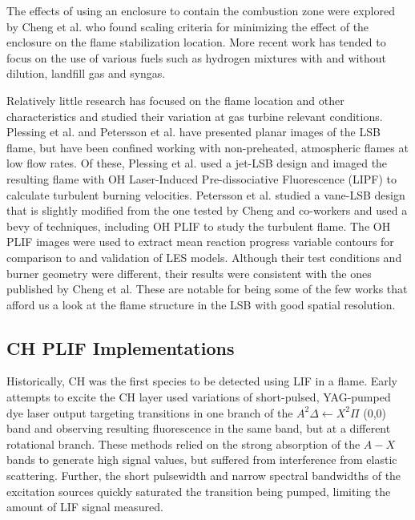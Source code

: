 The effects of using an enclosure to contain the combustion zone were explored by Cheng et al.\cite{2008-cheng-c} who found scaling criteria for minimizing the effect of the enclosure on the flame stabilization location. 
More recent work has tended to focus on the use of various fuels such as hydrogen mixtures\cite{2008-cheng-b} with and without dilution\cite{2007-littlejohn}, landfill gas\cite{2008-cheng-a,2009-cheng} and syngas\cite{2010-littlejohn}.

Relatively little research has focused on the flame location and other characteristics and studied their variation at gas turbine relevant conditions.
Plessing et al.\cite{2000-plessing} and Petersson et al.\cite{2007-petersson} have presented planar images of the LSB flame, but have been confined working with non-preheated, atmospheric flames at low flow rates.
Of these, Plessing et al. used a jet-LSB design and imaged the resulting flame with OH Laser-Induced Pre-dissociative Fluorescence (LIPF) to calculate turbulent burning velocities.
Petersson et al. studied a vane-LSB design that is slightly modified from the one tested by Cheng and co-workers and used a bevy of techniques, including OH PLIF to study the turbulent flame.
The OH PLIF images were used to extract mean reaction progress variable contours for comparison to and validation of LES models.
Although their test conditions and burner geometry were different, their results were consistent with the ones published by Cheng et al.
These are notable for being some of the few works that afford us a look at the flame structure in the LSB with good spatial resolution.

\subsection{CH PLIF Implementations}

Historically, CH was the first species to be detected using LIF in a flame.\cite{1973-barnes}
Early attempts\cite{1981-verdieck,1986-allen} to excite the CH layer used variations of short-pulsed, YAG-pumped dye laser output targeting transitions in one branch of the \(A^2\Delta\leftarrow X^2\Pi\) (0,0) band and observing resulting fluorescence in the same band, but at a different rotational branch.
These methods relied on the strong absorption of the \(A-X\) bands to generate high signal values, but suffered from interference from elastic scattering.
Further, the short pulsewidth and narrow spectral bandwidths of the excitation sources quickly saturated the transition being pumped, limiting the amount of LIF signal measured.

